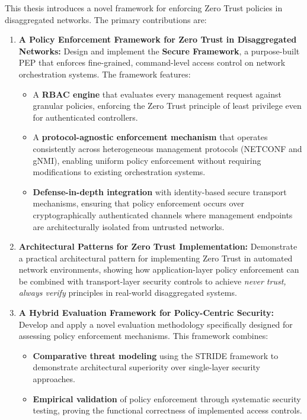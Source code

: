 \documentclass[12pt, a4paper, reqno, oneside]{book}
\begin{document}
This thesis introduces a novel framework for enforcing Zero Trust policies in disaggregated networks. The primary contributions are:
\begin{enumerate}
    \item \textbf{A Policy Enforcement Framework for Zero Trust in 
    Disaggregated Networks:} Design and implement the \textbf{Secure 
    Framework}, a purpose-built PEP that 
    enforces fine-grained, command-level access control on network 
    orchestration systems. The framework features:
    \begin{itemize}
        \item A \textbf{RBAC engine} that 
        evaluates every management request against granular policies, 
        enforcing the Zero Trust principle of least privilege even 
        for authenticated controllers.
        
        \item A \textbf{protocol-agnostic enforcement mechanism} that 
        operates consistently across heterogeneous management protocols 
        (NETCONF and gNMI), enabling uniform policy enforcement without 
        requiring modifications to existing orchestration systems.
        
        \item \textbf{Defense-in-depth integration} with identity-based 
        secure transport mechanisms, ensuring that policy enforcement 
        occurs over cryptographically authenticated channels where 
        management endpoints are architecturally isolated from 
        untrusted networks.
    \end{itemize}

    \item \textbf{Architectural Patterns for Zero Trust Implementation:} 
    Demonstrate a practical architectural pattern for implementing Zero 
    Trust in automated network environments, showing how application-layer 
    policy enforcement can be combined with transport-layer security 
    controls to achieve \textit{never trust, always verify} principles in 
    real-world disaggregated systems.

    \item \textbf{A Hybrid Evaluation Framework for Policy-Centric 
    Security:} Develop and apply a novel evaluation methodology 
    specifically designed for assessing policy enforcement mechanisms. 
    This framework combines:
    \begin{itemize}
        \item \textbf{Comparative threat modeling} using the STRIDE 
        framework to demonstrate architectural superiority over 
        single-layer security approaches.
        
        \item \textbf{Empirical validation} of policy enforcement 
        through systematic security testing, proving the functional 
        correctness of implemented access controls.
    \end{itemize}
\end{enumerate}
\end{document}
